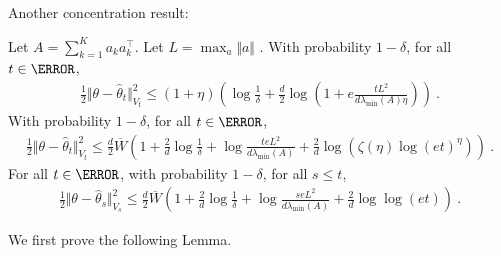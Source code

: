 
Another concentration result:
\begin{theorem}
Let $A = \sum_{k=1}^K a_k a_k^\top$. Let $L = \max_a \Vert a \Vert$ . With probability $1- \delta$, for all $t\in \N$,
\begin{align*}
\frac{1}{2}\Vert \theta - \hat{\theta}_t \Vert_{V_t}^2
\le (1+\eta)\left(
	\log\frac{1}{\delta}
	+ \frac{d}{2}\log\left( 1 + e\frac{t L^2}{d \lambda_{\min}(A) \eta} \right)
\right) \: .
\end{align*}
With probability $1- \delta$, for all $t\in \N$,
\begin{align*}
\frac{1}{2}\Vert \theta - \hat{\theta}_t \Vert_{V_t}^2
\le \frac{d}{2}\overline{W}\left(
	1 + \frac{2}{d}\log\frac{1}{\delta}
	+ \log \frac{t e L^2}{d \lambda_{\min}(A) }
	+ \frac{2}{d}\log(\zeta(\eta)\log(et)^\eta)
 \right) \: .
\end{align*}
For all $t\in\N$, with probability $1- \delta$, for all $s\le t$,
\begin{align*}
\frac{1}{2}\Vert \theta - \hat{\theta}_s \Vert_{V_s}^2
\le \frac{d}{2}\overline{W}\left(
	1 + \frac{2}{d}\log\frac{1}{\delta}
	+ \log \frac{s e L^2}{d \lambda_{\min}(A) }
	+ \frac{2}{d}\log\log(et)
 \right) \: .
\end{align*}
\end{theorem}

We first prove the following Lemma.

